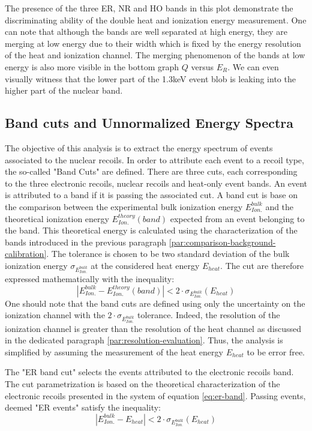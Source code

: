 The presence of the three ER, NR and HO bands in this plot demonstrate the discriminating ability of the double heat and ionization energy measurement. One can note that although the bands are well separated at high energy, they are merging at low energy due to their width which is fixed by the energy resolution of the heat and ionization channel. The merging phenomenon of the bands at low energy is also more visible in the bottom graph $Q$ versus $E_R$. We can even visually witness that the lower part of the 1.3keV event blob is leaking into the higher part of the nuclear band.


\subsection{Band cuts and Unnormalized Energy Spectra}
\label{par:band-cut}

The objective of this analysis is to extract the energy spectrum of events associated to the nuclear recoils. In order to attribute each event to a recoil type, the so-called "Band Cuts" are defined. There are three cuts, each corresponding to the three electronic recoils, nuclear recoils and heat-only event bands. An event is attributed to a band if it is passing the associated cut. A band cut is base on the comparison between the experimental bulk ionization energy $E_{Ion.}^{bulk}$ and the theoretical ionization energy $E_{Ion.}^{theory}(band)$ expected from an event belonging to the band. This theoretical energy is calculated using the characterization of the bands introduced in the previous paragraph \ref{par:comparison-background-calibration}. The tolerance is chosen to be two standard deviation of the bulk ionization energy $\sigma_{E_{Ion.}^{bulk}}$ at the considered heat energy $E_{heat}$. The cut are therefore expressed mathematically with the inequality:
\begin{equation}
|E_{Ion.}^{bulk} - E_{Ion.}^{theory}(band)| < 2 \cdot \sigma_{E_{Ion.}^{bulk}} \left( E_{heat}\right)
\end{equation}
One should note that the band cuts are defined using only the uncertainty on the ionization channel with the $2 \cdot \sigma_{E_{Ion.}^{bulk}}$ tolerance. Indeed, the resolution of the ionization channel is greater than the resolution of the heat channel as discussed in the dedicated paragraph \ref{par:resolution-evaluation}. Thus, the analysis is simplified by assuming the measurement of the heat energy $E_{heat}$ to be error free.

The "ER band cut" selects the events attributed to the electronic recoils band. The cut parametrization is based on the theoretical characterization of the electronic recoils presented in the system of equation \ref{eq:er-band}. Passing events, deemed "ER events" satisfy the inequality:
\begin{equation}
\label{eq:condition-ER-ecei}
|E_{Ion.}^{bulk} - E_ {heat}| < 2 \cdot \sigma_{E_{Ion.}^{bulk}} \left( E_{heat}\right)
\end{equation}

